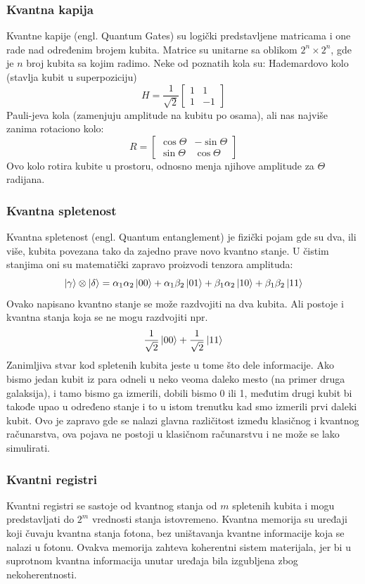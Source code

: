 \documentclass[12pt, letterpaper, oneside]{article}
\begin{document}
\subsubsection*{Kvantna kapija}
Kvantne kapije (engl. Quantum Gates) su logički predstavljene matricama i one rade nad određenim brojem kubita.
Matrice su unitarne sa oblikom $2^n \times 2^n$, gde je $n$ broj kubita sa kojim radimo. Neke od poznatih kola su: Hademardovo kolo (stavlja kubit u superpoziciju)
\[
    H = \frac{1}{\sqrt{2}}\begin{bmatrix}
        1 & 1 \\
        1 & -1
    \end{bmatrix}
\]
Pauli-jeva kola (zamenjuju amplitude na kubitu po osama), ali nas najviše zanima rotaciono kolo:
\[
    R = \begin{bmatrix}
        \cos{\Theta} & -\sin{\Theta} \\
        \sin{\Theta} & \cos{\Theta} 
    \end{bmatrix}
\]
Ovo kolo rotira kubite u prostoru, odnosno menja njihove amplitude za $\Theta$ radijana.
\subsubsection*{Kvantna spletenost}
Kvantna spletenost (engl. Quantum entanglement) je fizički pojam gde su dva, ili više, kubita povezana tako da zajedno prave novo kvantno stanje.
U čistim stanjima oni su matematički zapravo proizvodi tenzora amplituda:
\[
    \ket{\gamma} \otimes \ket{\delta} = \alpha_1\alpha_2\ket{00} + \alpha_1\beta_2\ket{01} + \beta_1\alpha_2\ket{10} + \beta_1\beta_2\ket{11}
\]
Ovako napisano kvantno stanje se može razdvojiti na dva kubita. Ali postoje i kvantna stanja koja se ne mogu razdvojiti npr.
\[
 \frac{1}{\sqrt{2}}\ket{00} + \frac{1}{\sqrt{2}}\ket{11}
\]
Zanimljiva stvar kod spletenih kubita jeste u tome što dele informacije. Ako bismo jedan kubit iz para odneli u neko veoma daleko mesto (na primer druga galaksija),
i tamo bismo ga izmerili, dobili bismo 0 ili 1, međutim drugi kubit bi takođe upao u određeno stanje i to u istom trenutku kad smo izmerili prvi daleki kubit.
Ovo je zapravo gde se nalazi glavna različitost između klasičnog i kvantnog računarstva, ova pojava ne postoji u klasičnom računarstvu i ne može se lako simulirati.
\subsubsection*{Kvantni registri}
Kvantni registri se sastoje od kvantnog stanja od $m$ spletenih kubita i mogu predstavljati do $2^m$ vrednosti stanja istovremeno.
Kvantna memorija su uređaji koji čuvaju kvantna stanja fotona, bez uništavanja kvantne informacije koja se nalazi u fotonu.
Ovakva memorija zahteva koherentni sistem materijala, jer bi u suprotnom kvantna informacija unutar uređaja bila izgubljena zbog nekoherentnosti.
\end{document}
